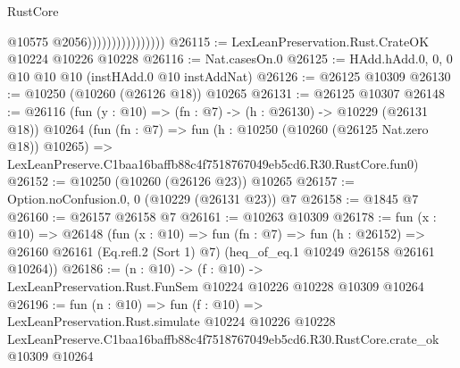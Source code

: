 \begin{lexlean}{RustCore}
\begin{coremodule}
                                    @10575
                                    @2056))))))))))))))))
@26115 := LexLeanPreservation.Rust.CrateOK @10224 @10226 @10228
@26116 := Nat.casesOn.{0}
@26125 := HAdd.hAdd.{0, 0, 0} @10 @10 @10 (instHAdd.{0} @10 instAddNat)
@26126 := @26125 @10309
@26130 := @10250 (@10260 (@26126 @18)) @10265
@26131 := @26125 @10307
@26148 := @26116
    (fun (y : @10) => (fn : @7) -> (h : @26130) -> @10229 (@26131 @18))
    @10264
    (fun (fn : @7) =>
    fun (h : @10250 (@10260 (@26125 Nat.zero @18)) @10265) =>
    LexLeanPreserve.C1baa16baffb88c4f7518767049eb5cd6.R30.RustCore.fun0)
@26152 := @10250 (@10260 (@26126 @23)) @10265
@26157 := Option.noConfusion.{0, 0} (@10229 (@26131 @23)) @7
@26158 := @1845 @7
@26160 := @26157 @26158 @7
@26161 := @10263 @10309
@26178 := fun (x : @10) =>
  @26148
    (fun (x : @10) =>
    fun (fn : @7) =>
    fun (h : @26152) =>
    @26160 @26161 (Eq.refl.{2} (Sort 1) @7) (heq_of_eq.{1} @10249 @26158 @26161 @10264))
@26186 := (n : @10) ->
  (f : @10) -> LexLeanPreservation.Rust.FunSem @10224 @10226 @10228 @10309 @10264
@26196 := fun (n : @10) =>
  fun (f : @10) =>
  LexLeanPreservation.Rust.simulate
    @10224
    @10226
    @10228
    LexLeanPreserve.C1baa16baffb88c4f7518767049eb5cd6.R30.RustCore.crate_ok
    @10309
    @10264
\end{coremodule}
\end{lexlean}
